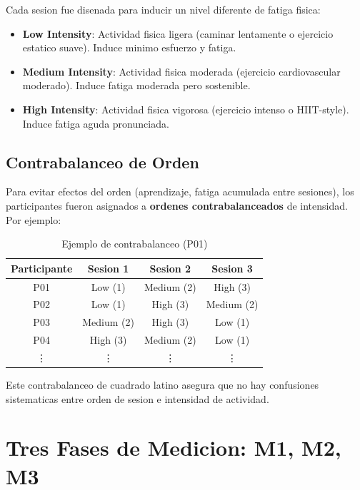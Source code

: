 Cada sesion fue disenada para inducir un nivel diferente de fatiga fisica:

\begin{itemize}
    \item \textbf{Low Intensity}: Actividad fisica ligera (caminar lentamente o
          ejercicio estatico suave). Induce minimo esfuerzo y fatiga.

    \item \textbf{Medium Intensity}: Actividad fisica moderada (ejercicio cardiovascular
          moderado). Induce fatiga moderada pero sostenible.

    \item \textbf{High Intensity}: Actividad fisica vigorosa (ejercicio intenso o HIIT-style).
          Induce fatiga aguda pronunciada.
\end{itemize}

\subsection{Contrabalanceo de Orden}

Para evitar efectos del orden (aprendizaje, fatiga acumulada entre sesiones),
los participantes fueron asignados a \textbf{ordenes contrabalanceados} de intensidad.
Por ejemplo:

\begin{table}[H]
\centering
\caption{Ejemplo de contrabalanceo (P01)}
\begin{tabular}{|c|c|c|c|}
\hline
\textbf{Participante} & \textbf{Sesion 1} & \textbf{Sesion 2} & \textbf{Sesion 3} \\
\hline
P01 & Low (1) & Medium (2) & High (3) \\
P02 & Low (1) & High (3) & Medium (2) \\
P03 & Medium (2) & High (3) & Low (1) \\
P04 & High (3) & Medium (2) & Low (1) \\
\vdots & \vdots & \vdots & \vdots \\
\hline
\end{tabular}
\end{table}

Este contrabalanceo de cuadrado latino asegura que no hay confusiones sistematicas
entre orden de sesion e intensidad de actividad.

\section{Tres Fases de Medicion: M1, M2, M3}

